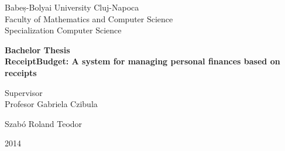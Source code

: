 	
\begin{titlepage}
    \begin{center}
        \vspace*{1cm}
        
        \Large
        Babeș-Bolyai University Cluj-Napoca \\
		Faculty of Mathematics and Computer Science \\
		Specialization Computer Science

		\vspace{1.5cm}
        \Huge
        \textbf{Bachelor Thesis} \\
        \textbf{ReceiptBudget: A system for managing personal finances based on receipts}
\end{center}        

        \vspace{1.5cm}
		\Large
        \begin{minipage}[t]{0.5\textwidth}
       		Supervisor \\
        	Profesor Gabriela Czibula \\
		\end{minipage}
		\begin{minipage}[t]{0.5\textwidth}
			\begin{raggedleft}
				{\raggedleft{}Szabó Roland Teodor}				
			\end{raggedleft}
		\end{minipage}
        \vfill

        \vspace{0.8cm}
\begin{center}
	\Huge
        2014
\end{center}
        
\end{titlepage}